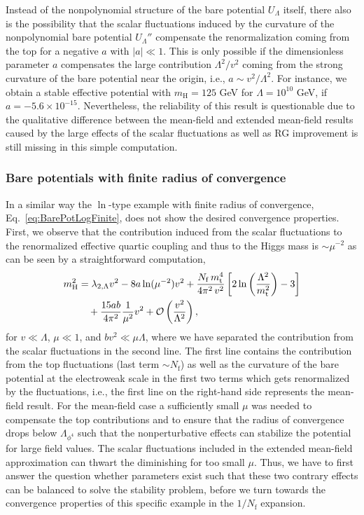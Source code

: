 \documentclass[twocolumn,aps,prd,showpacs,nofootinbib,superscriptaddress,preprintnumbers,floatfix,10pt]{revtex4-1}
\newcommand{\Nf}{N_{\mathrm{f}}}
\newcommand{\UL}{U_{\Lambda}}
\newcommand{\lL}{\lambda_{2,\Lambda}}
\newcommand{\mH}{m_{\text{H}}}
\newcommand{\mtop}{m_{\text{t}}}
\begin{document}
Instead of the nonpolynomial structure of the bare potential $\UL$ itself, there also is the possibility that the scalar fluctuations induced by the curvature of the nonpolynomial bare potential $\UL''$ compensate the renormalization coming from the top for a negative $a$ with $|a| \ll 1$. 
This is only possible if the dimensionless parameter $a$ compensates the large contribution $\Lambda^{2}/v^{2}$ coming from the strong curvature of the bare potential near the origin, i.e., $a \sim v^{2}/\Lambda^{2}$. For instance, we obtain a stable effective potential  with $\mH = 125$ GeV for $\Lambda = 10^{10}$ GeV, if $a = -5.6 \times 10^{-15}$. Nevertheless, the reliability of this result is questionable due to the qualitative difference between the mean-field and extended mean-field results caused by the large effects of the scalar fluctuations as well as RG improvement is still missing in this simple computation.







\subsubsection{Bare potentials with finite radius of convergence}
In a similar way the $\ln$-type example with finite radius of convergence, Eq.~\eqref{eq:BarePotLogFinite}, does not show the desired convergence properties.
First, we observe that the contribution induced from the scalar fluctuations to the renormalized effective quartic coupling and thus to the Higgs mass is $\sim \mu^{-2}$ as can be seen by a straightforward computation,  
%
\begin{align}
 \mH^{2}
 &= \lL v^{2} - 8a \ln (\mu^{-2}) v^{2} + \frac{\Nf\, \mtop^{4}}{4\pi^{2}\, v^{2}} \left[ 2 \ln\left( \frac{\Lambda^{2}}{\mtop^{2}} \right) - 3 \right]  \notag \\ 
&\quad  + \frac{15ab}{4\pi^{2}} \frac{1}{\mu^{2}} v^{2} + \mathcal{O}\left(\frac{v^{2}}{\Lambda^{2}}\right),
\label{eq:HiggsMassLog}
\end{align}
%
for $v\ll \Lambda$, $\mu \ll 1$, and $bv^{2} \ll \mu\Lambda$, where we have separated the contribution from the scalar fluctuations in the second line.
The first line contains the contribution from the top fluctuations (last term ${\sim}\Nf$) as well as the curvature of the bare potential at the electroweak scale in the first two terms which gets renormalized by the fluctuations, i.e., the first line on the right-hand side represents the mean-field result. 
For the mean-field case a sufficiently small $\mu$ was needed to compensate the top contributions and to ensure that the radius of convergence drops below $\Lambda_{\phi^{4}}$ such that the nonperturbative effects can stabilize the potential for large field values. 
The scalar fluctuations included in the extended mean-field approximation can thwart the diminishing for too small $\mu$.
Thus, we have to first answer the question whether parameters exist such that these two contrary effects can be balanced to solve the stability problem, before we turn towards the convergence properties of this specific example in the $1/\Nf$ expansion. 
\end{document}

